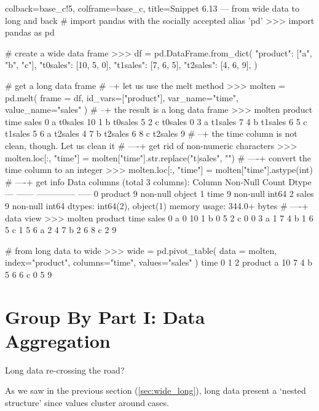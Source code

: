 \documentclass[a4paper,11pt]{book}
\newcommand{\question}[1]{%
    \begin{tcolorbox}[colback=comp_c!10,colframe=comp_c,sidebyside align=top,width=\linewidth,before skip=1ex]
        #1
    \end{tcolorbox}
    \switchcolumn%
}
\newcommand{\note}[1]{%
    \begin{tcolorbox}[colback=white!0,colframe=white!10,width=\linewidth,before skip=1ex]
        #1
    \end{tcolorbox}
}
\begin{document}
\begin{pythoncode}[linenos=True]{colback=base_c!5, colframe=base_c, title=\sffamily Snippet 6.13 --- from wide data to long and back}
# import pandas with the socially accepted alias 'pd'
>>> import pandas as pd

# create a wide data frame
>>> df = pd.DataFrame.from_dict(
        {
            "product": ["a", "b", "c"],
            "t0sales": [10, 5, 0],
            "t1sales": [7, 6, 5],
            "t2sales": [4, 6, 9],
        }
    )

# get a long data frame
# --+ let us use the melt method 
>>> molten = pd.melt(
	frame = df, id_vars=["product"], var_name="time", value_name="sales"
    )
# --+ the result is a long data frame
>>> molten
  product     time  sales
0       a  t0sales     10
1       b  t0sales      5
2       c  t0sales      0
3       a  t1sales      7
4       b  t1sales      6
5       c  t1sales      5
6       a  t2sales      4
7       b  t2sales      6
8       c  t2sales      9
# --+ the time column is not clean, though. Let us clean it
# ----+ get rid of non-numeric characters
>>> molten.loc[:, "time"] = molten["time"].str.replace("t|sales", "")
# ----+ convert the time column to an integer
>>> molten.loc[:, "time"] = molten["time"].astype(int)
# ----+ get info
Data columns (total 3 columns):
     Column   Non-Null Count  Dtype 
---  ------   --------------  ----- 
 0   product  9 non-null      object
 1   time     9 non-null      int64 
 2   sales    9 non-null      int64 
dtypes: int64(2), object(1)
memory usage: 344.0+ bytes
# ----+ data view
>>> molten
  product  time  sales
0       a     0     10
1       b     0      5
2       c     0      0
3       a     1      7
4       b     1      6
5       c     1      5
6       a     2      4
7       b     2      6
8       c     2      9

# from long data to wide 
>>> wide = pd.pivot_table(
	data = molten, index="product", columns="time", values="sales"
    )
time      0  1  2
product          
a        10  7  4
b         5  6  6
c         0  5  9
\end{pythoncode}
\clearpage
\section{Group By Part I: Data Aggregation}
\label{sec:groupby_aggr}

\begin{paracol}{2}
	\question{\raggedright Long data re-crossing the road?}
	\note{As we saw in the previous section (\ref{sec:wide_long}), long data present a `nested structure' since values cluster around cases.}
\end{paracol}
\end{document}
